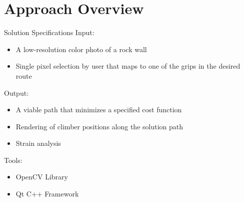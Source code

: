 \documentclass{beamer}
\begin{document}
\section{Approach Overview}

\begin{frame}[t]{Solution Specifications}
Input:
\begin{itemize}
 \item A low-resolution color photo of a rock wall
 \item Single pixel selection by user that maps to one of the grips in the desired route
\end{itemize}
\vspace{.3cm}
\pause

Output:
\begin{itemize}
 \item A viable path that minimizes a specified cost function
 \item Rendering of climber positions along the solution path
 \item Strain analysis
\end{itemize}

\pause
\vspace{.3cm}
Tools:
\begin{itemize}
 \item OpenCV Library
 \item Qt C++ Framework
\end{itemize}
\end{frame}
\end{document}
